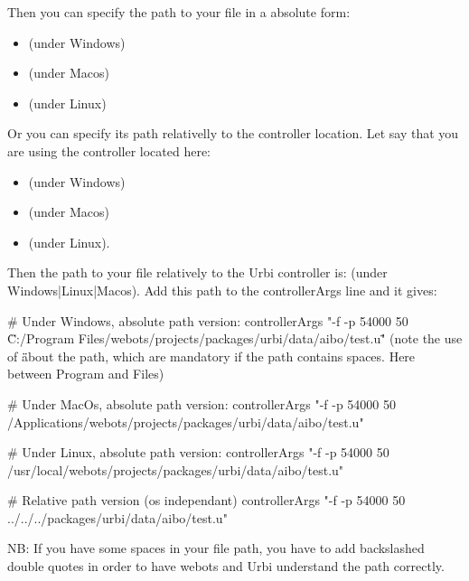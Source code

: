 Then you can specify the path to your file in a absolute form:
\begin{itemize}
\item {}
  (under Windows)
\item {}
  (under Macos)
\item {}
  (under Linux)
\end{itemize}

Or you can specify its path relativelly to the \urbi controller
location.  Let say that you are using the \urbi controller located
here:
\begin{itemize}
\item {}
  (under Windows)
\item
  (under Macos)
\item {}
  (under Linux).
\end{itemize}

Then the path to your file relatively to the Urbi controller is:
 (under
Windows|Linux|Macos).  Add this path to the controllerArgs line and it
gives:

\begin{shell}
# Under Windows, absolute path version:
controllerArgs "-f -p 54000 50 \"C:/Program Files/webots/projects/packages/urbi/data/aibo/test.u\""
(note the use of \" \" about the path, which are mandatory if the path
contains spaces. Here between Program and Files)

# Under MacOs, absolute path version:
controllerArgs "-f -p 54000 50 /Applications/webots/projects/packages/urbi/data/aibo/test.u"

# Under Linux, absolute path version:
controllerArgs "-f -p 54000 50 /usr/local/webots/projects/packages/urbi/data/aibo/test.u"

# Relative path version (os independant)
controllerArgs "-f -p 54000 50 ../../../packages/urbi/data/aibo/test.u"
\end{shell}

NB: If you have some spaces in your file path, you have to add
backslashed double quotes in order to have webots and Urbi understand
the path correctly.

